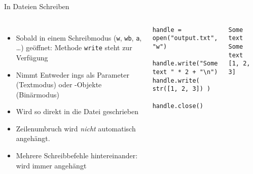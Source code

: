 \begin{frame}[fragile]{In Dateien Schreiben}
%
\begin{columns}[T]
\begin{itemize}
\item Sobald in einem Schreibmodus (\texttt{w}, \texttt{wb}, \texttt{a}, \ldots) geöffnet: Methode \texttt{write} steht zur Verfügung
\item Nimmt Entweder ings als Parameter (Textmodus) oder -Objekte (Binärmodus)
\item Wird so direkt in die Datei geschrieben
\item Zeilenumbruch wird \emph{nicht} automatisch angehängt.
\item Mehrere Schreibbefehle hintereinander: wird immer angehängt
\end{itemize}
%
\begin{codebox}
\begin{verbatim}
handle = open("output.txt", "w")

handle.write("Some text " * 2 + "\n")
handle.write( str([1, 2, 3]) )

handle.close()
\end{verbatim}
\end{codebox}
%
\begin{cmdbox}
\begin{verbatim}
Some text Some text
[1, 2, 3]
\end{verbatim}
\end{cmdbox}
\end{columns}
%
\end{frame}



